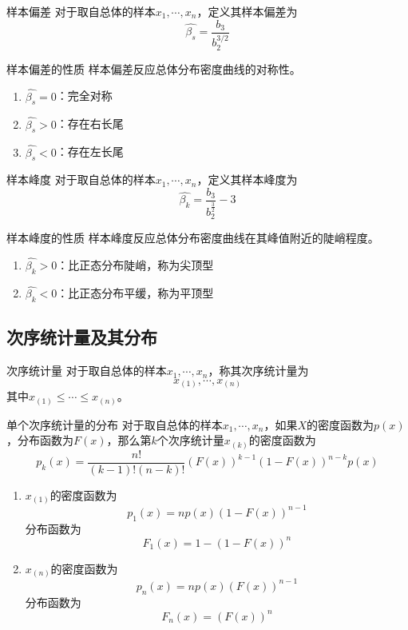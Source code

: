 \documentclass[lang = cn, scheme = chinese, thmcnt = section]{elegantbook}
\begin{document}
\begin{definition}{样本偏差}
	对于取自总体的样本$x_1,\cdots,x_n$，定义其样本偏差为
	$$
	\hat{\beta_s}=\frac{b_3}{b_2^{3/2}}
	$$
\end{definition}

\begin{proposition}{样本偏差的性质}
	样本偏差反应总体分布密度曲线的对称性。
	\begin{enumerate}
		\item $\hat{\beta_s}=0$：完全对称
		\item $\hat{\beta_s}>0$：存在右长尾
		\item $\hat{\beta_s}<0$：存在左长尾
	\end{enumerate}
\end{proposition}

\begin{definition}{样本峰度}
	对于取自总体的样本$x_1,\cdots,x_n$，定义其样本峰度为
	$$
	\hat{\beta_k}=\frac{b_3}{b_2^{\frac{3}{2}}}-3
	$$
\end{definition}

\begin{proposition}{样本峰度的性质}
	样本峰度反应总体分布密度曲线在其峰值附近的陡峭程度。
	\begin{enumerate}
		\item $\hat{\beta_k}>0$：比正态分布陡峭，称为尖顶型
		\item $\hat{\beta_k}<0$：比正态分布平缓，称为平顶型
	\end{enumerate}
\end{proposition}

\subsection{次序统计量及其分布}

\begin{definition}{次序统计量}
	对于取自总体的样本$x_1,\cdots,x_n$，称其次序统计量为
	$$
	x_{(1)},\cdots,x_{(n)}
	$$
	其中$x_{(1)}\le \cdots\le x_{(n)}$。
\end{definition}

\begin{theorem}{单个次序统计量的分布}
	对于取自总体的样本$x_1,\cdots,x_n$，如果$X$的密度函数为$p(x)$，分布函数为$F(x)$，那么第$k$个次序统计量$x_{(k)}$的密度函数为
	$$
	p_k(x)=\frac{n!}{(k-1)!(n-k)!}\left( F(x) \right)^{k-1}\left( 1-F(x) \right)^{n-k}p(x)
	$$
\end{theorem}

\begin{corollary}
	\begin{enumerate}
		\item $x_{(1)}$的密度函数为
		$$
		p_1(x)=np(x)(1-F(x))^{n-1}
		$$
		分布函数为
		$$
		F_1(x)=1-(1-F(x))^n
		$$
		\item $x_{(n)}$​的密度函数为
		$$
		p_n(x)=np(x)(F(x))^{n-1}
		$$
		分布函数为
		$$
		F_n(x)=(F(x))^n
		$$
	\end{enumerate}
\end{corollary}
\end{document}
